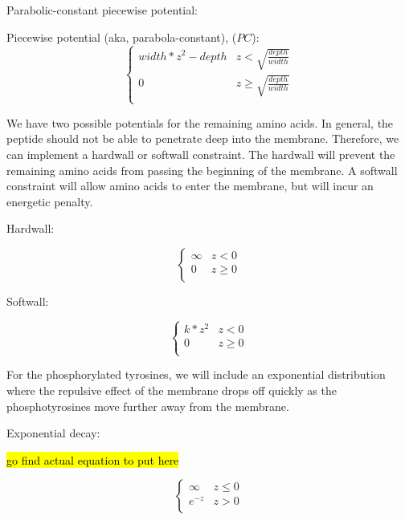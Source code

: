 \documentclass[../../AdvancementSummary.tex]{subfiles}
\begin{document}
Parabolic-constant piecewise potential:

Piecewise potential (aka, parabola-constant), ($PC$):
\begin{equation}\label{eq: parabolaconstant}
\begin{cases}
width*z^2-depth 	& z<\sqrt{\frac{depth}{width}}\\
0 & z \geq \sqrt{\frac{depth}{width}} \\
\end{cases}
\end{equation}

We have two possible potentials for the remaining amino acids.  In general, the peptide should not be able to penetrate deep into the membrane. Therefore, we can implement a hardwall or softwall constraint. The hardwall will prevent the remaining amino acids from passing the beginning of the membrane. A softwall constraint will allow amino acids to enter the membrane, but will incur an energetic penalty. 

Hardwall:

\begin{equation}\label{eq: hardwall}
\begin{cases}
\infty 	& z < 0\\
0 & z \geq 0 \\
\end{cases}
\end{equation}


Softwall:

\begin{equation}\label{eq: softwall}
\begin{cases}
k*z^2 	& z < 0\\
0 & z \geq 0 \\
\end{cases}
\end{equation}



For the phosphorylated tyrosines, we will include an exponential distribution where the repulsive effect of the membrane drops off quickly as the phosphotyrosines move further away from the membrane.


Exponential decay:

\hl{go find actual equation to put here}

\begin{equation}
\begin{cases}
\infty	& z \leq 0\\
e^{-z} & z > 0 \\
\end{cases}
\end{equation}
\end{document}
